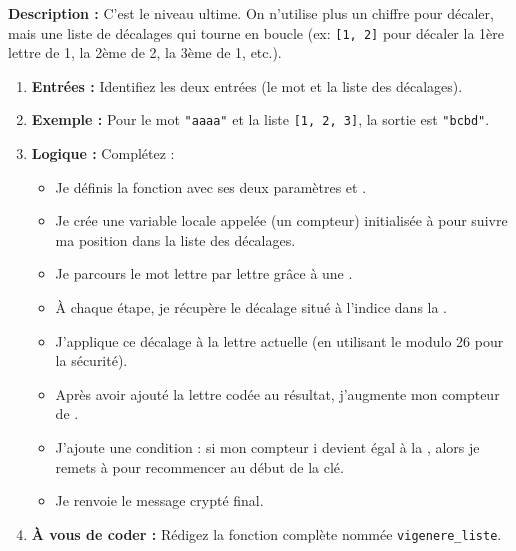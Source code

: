 \begin{Exercise}[title={Bonus 2 : Le Chiffre de Vigenère (Expert) }]
\textbf{Description :} C'est le niveau ultime. On n'utilise plus un chiffre pour décaler, mais une liste de décalages qui tourne en boucle (ex: \texttt{[1, 2]} pour décaler la 1ère lettre de 1, la 2ème de 2, la 3ème de 1, etc.). 
\begin{enumerate}
\item \textbf{Entrées :} Identifiez les deux entrées (le mot et la liste des décalages).
\item \textbf{Exemple :} Pour le mot \texttt{"aaaa"} et la liste \texttt{[1, 2, 3]}, la sortie est \texttt{"bcbd"}.
\item \textbf{Logique :} Complétez :
    \begin{itemize}
        \item Je définis la fonction avec ses deux paramètres \dotfill et \dotfill.
        \item Je crée une variable locale appelée \dotfill (un compteur) initialisée à \dotfill pour suivre ma position dans la liste des décalages.
        \item Je parcours le mot lettre par lettre grâce à une \dotfill.
        \item À chaque étape, je récupère le décalage situé à l'indice \dotfill dans la \dotfill.
        \item J'applique ce décalage à la lettre actuelle (en utilisant le modulo 26 pour la sécurité).
        \item Après avoir ajouté la lettre codée au résultat, j'augmente mon compteur \dotfill de \dotfill.
        \item J'ajoute une condition : si mon compteur i devient égal à la \dotfill, alors je remets \dotfill à \dotfill pour recommencer au début de la clé.
        \item Je renvoie le message crypté \dotfill final.
    \end{itemize}
\item \textbf{À vous de coder :} Rédigez la fonction complète nommée \texttt{vigenere\_liste}.
\end{enumerate}
\end{Exercise}